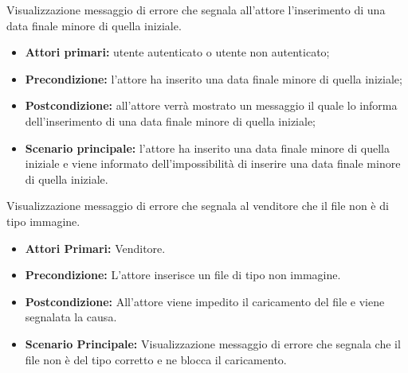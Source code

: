 Visualizzazione messaggio di errore che segnala all'attore l'inserimento di una data finale minore di quella iniziale.
\begin{itemize}
    \item \textbf{Attori primari:} utente autenticato o utente non autenticato;
    \item \textbf{Precondizione:} l'attore ha inserito una data finale minore di quella iniziale;
    \item \textbf{Postcondizione:} all'attore verrà mostrato un messaggio il quale lo informa dell'inserimento di una data finale minore di quella iniziale;
    \item \textbf{Scenario principale:} l'attore ha inserito una data finale minore di quella iniziale e viene informato dell'impossibilità di inserire una data finale minore di quella iniziale.
\end{itemize}

\begin{comment}
\UC{Visualizzazione messaggio di errore prodotto non disponibile}
L'acquirente o l'utente non autenticato richiede un prodotto che non è disponibile.
\begin{itemize}
    \item \textbf{Attori primari:} acquirente o utente non autenticato;
    \item \textbf{Precondizione:} L'attore richiede di aggiungere al carrello un prodotto non disponibile;
    \item \textbf{Postcondizione:} viene impedita l'aggiunta al carrello e segnalata la causa.
    \item \textbf{Scenario principale:}
        \begin{itemize}
            \item L'utente richiede di aggiungere al carrello un prodotto non disponibile;
            \item Viene scartata la modifica, il carrello rimane invariato;
            \item Viene visualizzato un visualizzato un errore che indica la non disponibilità del prodotto.
        \end{itemize}
\end{itemize}
\end{comment}

Visualizzazione messaggio di errore che segnala al venditore che il file non è di tipo immagine.
\begin{itemize}
    \item \textbf{Attori Primari:} Venditore.
    \item \textbf{Precondizione:} L'attore inserisce un file di tipo non immagine.
    \item \textbf{Postcondizione:} All'attore viene impedito il caricamento del file e viene segnalata la causa.
    \item \textbf{Scenario Principale:} Visualizzazione messaggio di errore che segnala che il file non è del tipo corretto e ne blocca il caricamento.
\end{itemize}

